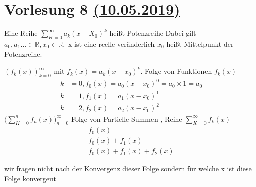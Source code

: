 \section{Vorlesung 8 \href{https://tu-dresden.de/mn/math/algebra/das-institut/beschaeftigte/antje-noack/ressourcen/dateien/v120-1/MathMethInf08.pdf?lang=en}{(10.05.2019)}}
\begin{definition}
Eine Reihe $\sum_{K=0}^{\infty}{a_k (x - X_0)^k} $ heißt Potenzreihe Dabei gilt $a_0,a_1 \dots \in \mathbb{R} , x_0 \in \mathbb{R} ,$ x ist eine reelle veränderlich $x_0$ heißt Mittelpunkt der Potenzreihe.    
\end{definition}

\begin{remark}
$(f_k(x))_{k=0}^{\infty}$ mit $f_k(x) = a_k(x-x_0)^k$. Folge von Funktionen $f_k(x)$
\begin{align*}
k &= 0 ,f_0(x) = a_0(x-x_0)^0 = a_0 \times 1 = a_0\\
k &= 1 ,f_1(x) = a_1(x-x_0)^1\\
k &= 2 ,f_2(x) = a_2(x-x_0)^2
\end{align*}
$ \big( \sum_{K=0}^{n}{f_n(x)} \big)_{n=0}^{\infty} $ Folge von Partielle Summen , Reihe $\sum_{K=0}^{\infty}{f_k(x)}$
\begin{gather*}
f_0(x)\\
f_0(x) + f_1(x)\\
f_0(x) + f_1(x) + f_2(x)
\end{gather*}
\end{remark}

\begin{remark}
wir fragen nicht nach der Konvergenz dieser Folge sondern für welche x ist diese Folge konvergent 
\end{remark}

